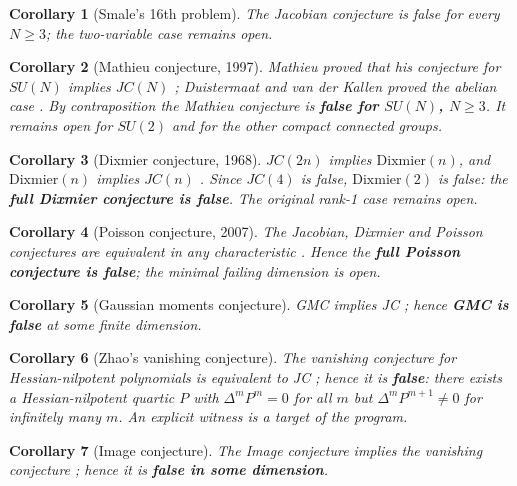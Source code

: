 \documentclass[11pt]{article}
\newtheorem{corollary}{Corollary}
\begin{document}
\begin{corollary}[Smale's 16th problem]
The Jacobian conjecture is false for every $N \ge 3$; the two-variable case remains open.
\end{corollary}

\begin{corollary}[Mathieu conjecture, 1997]
Mathieu proved that his conjecture for $SU(N)$ implies $JC(N)$ \cite{Mathieu1997, Zwart2025};
Duistermaat and van der Kallen proved the abelian case \cite{DvdK1998}. By contraposition the
Mathieu conjecture is \textbf{false for $SU(N)$, $N \ge 3$}. It remains open for $SU(2)$ and
for the other compact connected groups.
\end{corollary}

\begin{corollary}[Dixmier conjecture, 1968]
$JC(2n)$ implies $\mathrm{Dixmier}(n)$, and $\mathrm{Dixmier}(n)$ implies $JC(n)$
\cite{BKK2007, Tsuchimoto2005}. Since $JC(4)$ is false, $\mathrm{Dixmier}(2)$ is false: the
\textbf{full Dixmier conjecture is false}. The original rank-1 case remains open.
\end{corollary}

\begin{corollary}[Poisson conjecture, 2007]
The Jacobian, Dixmier and Poisson conjectures are equivalent in any characteristic
\cite{AvdE2007}. Hence the \textbf{full Poisson conjecture is false}; the minimal failing
dimension is open.
\end{corollary}

\begin{corollary}[Gaussian moments conjecture]
GMC implies JC \cite{DEZ2017}; hence \textbf{GMC is false} at some finite dimension.
\end{corollary}

\begin{corollary}[Zhao's vanishing conjecture]
The vanishing conjecture for Hessian-nilpotent polynomials is equivalent to JC
\cite{Zhao2004, Zhao2007}; hence it is \textbf{false}: there exists a Hessian-nilpotent
quartic $P$ with $\Delta^m P^m = 0$ for all $m$ but $\Delta^m P^{m+1} \ne 0$ for infinitely
many $m$. An explicit witness is a target of the program.
\end{corollary}

\begin{corollary}[Image conjecture]
The Image conjecture implies the vanishing conjecture \cite{vdE2010}; hence it is
\textbf{false in some dimension}.
\end{corollary}
\end{document}
